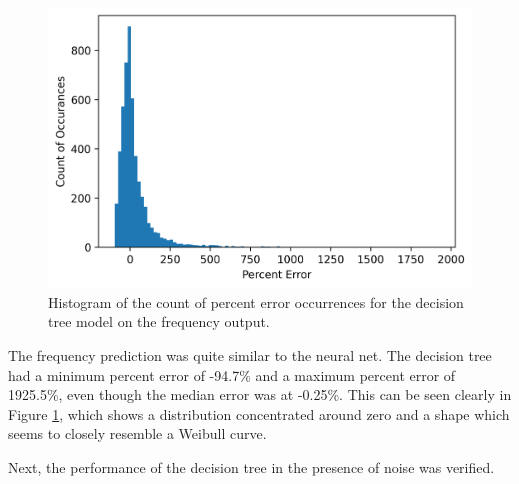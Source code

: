 \documentclass[conference]{IEEEtran}
\begin{document}
\begin{figure}
	\centering
	\includegraphics[width=1\linewidth]{images/dt_test_dataset_freq_perc_error_hist}
	\caption{Histogram of the count of percent error occurrences for the decision tree model on the frequency output.}
	\label{fig:dt_test_dataset_freq_perc_error_hist}
\end{figure}

The frequency prediction was quite similar to the neural net.
The decision tree had a minimum percent error of -94.7\% and a maximum percent error of 1925.5\%, even though the median error was at -0.25\%. 
This can be seen clearly in Figure \ref{fig:dt_test_dataset_freq_perc_error_hist}, which shows a distribution concentrated around zero and a shape which seems to closely resemble a Weibull curve. 

Next, the performance of the decision tree in the presence of noise was verified.
\begin{table}
	\centering
	\caption{Error Count for Evaluation Data from Decision Tree}
	\setlength\extrarowheight{2pt}
	\label{tbl:error_count_dt}
\end{table}
\end{document}
